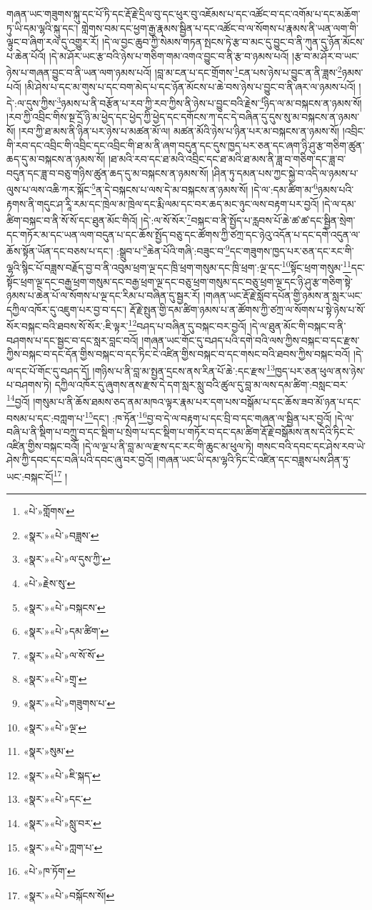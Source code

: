 གཞན་ཡང་གཟུགས་སྐུ་དང་པོ་ཏི་དང་རྡོ་རྗེ་དྲིལ་བུ་དང་ཕུར་བུ་འཇོམས་པ་དང་འཚོང་བ་དང་འགོམ་པ་དང་མཆོག་ཏུ་ཡི་དམ་ལྷའི་སྐུ་དང་། གླེགས་བམ་དང་ཕྱག་རྒྱ་རྣམས་སྦྱིན་པ་དང་འཚོང་བ་ལ་སོགས་པ་རྣམས་ནི་ཡན་ལག་གི་ལྟུང་བ་ཞིག་རལ་དུ་འགྱུར་རོ། །དེ་ལ་བྱང་ཆུབ་ཀྱི་སེམས་གཏན་སྤངས་ཏེ་རྩ་བ་མང་དུ་བྱུང་བ་ནི་ཀུན་དུ་ཉོན་མོངས་པ་ཆེན་པོའོ། །དེ་མ་ཤོར་ཡང་རྩ་བའི་ཉེས་པ་གཅིག་གམ་འགའ་བྱུང་བ་ནི་རྩ་བ་ཉམས་པའོ། །རྩ་བ་མ་ཤོར་བ་ཡང་ཉེས་པ་གཞན་བྱུང་བ་ནི་ཡན་ལག་ཉམས་པའོ། །བླ་མ་ངན་པ་དང་གྲོགས་\footnote{«པེ་»གློགས་}ངན་པས་ཉེས་པ་བྱུང་ན་ནི་ཟླས་\footnote{«སྣར་»«པེ་»བཟླས་}ཉམས་པའོ། །མི་ཤེས་པ་དང་མ་གུས་པ་དང་བག་མེད་པ་དང་ཉོན་མོངས་པ་ཆེ་བས་ཉེས་པ་བྱུང་བ་ནི་ཞར་ལ་ཉམས་པའོ། །དེ་:ལ་དུས་ཀྱིས་\footnote{«སྣར་»«པེ་»ལ་དུས་ཀྱི་}ཉམས་པ་ནི་བརྩོན་པ་རབ་ཀྱི་རབ་ཀྱིས་ནི་ཉེས་པ་བྱུང་བའི་རྗེས་\footnote{«པེ་»རྗེས་སུ་}ཉིད་ལ་མ་བསྐངས་ན་ཉམས་སོ། །རབ་ཀྱི་འབྲིང་གིས་སྔ་དྲོ་ཉི་མ་ཕྱེད་དང་ཕྱེད་ཀྱི་ཕྱེད་དང་དགོངས་ཀ་དང་དེ་བཞིན་དུ་དུས་སུ་མ་བསྐངས་ན་ཉམས་སོ། །རབ་ཀྱི་ཐ་མས་ནི་ཉིན་པར་ཉེས་པ་མཚན་མོ་ལ། མཚན་མོའི་ཉེས་པ་ཉིན་པར་མ་བསྐངས་ན་ཉམས་སོ། །འབྲིང་གི་རབ་དང་འབྲིང་གི་འབྲིང་དང་འབྲིང་གི་ཐ་མ་ནི་ཞག་བདུན་དང་དུས་ཁྱད་པར་ཅན་དང་ཞག་ཉི་ཤུ་རྩ་གཅིག་ཚུན་ཆད་དུ་མ་བསྐངས་ན་ཉམས་སོ། །ཐ་མའི་རབ་དང་ཐ་མའི་འབྲིང་དང་ཐ་མའི་ཐ་མས་ནི་ཟླ་བ་གཅིག་དང་ཟླ་བ་བདུན་དང་ཟླ་བ་བཅུ་གཉིས་ཚུན་ཆད་དུ་མ་བསྐངས་ན་ཉམས་སོ། །ཤིན་ཏུ་དམན་པས་ཀྱང་སྐྱེ་བ་འདི་ལ་ཉམས་པ་ལུས་པ་ལས་འཆི་ཀར་སྐོང་\footnote{«སྣར་»«པེ་»བསྐངས་}ན་དེ་བསྐངས་པ་ལས་དེ་མ་བསྐངས་ན་ཉམས་སོ། །དེ་ལ་:དམ་ཚིག་མ་\footnote{«སྣར་»«པེ་»དམ་ཚིག་}ཉམས་པའི་རྟགས་ནི་གདུང་ཤ་རཱི་རམ་དང་ཁྲེལ་མ་ཁྲེལ་དང་རྨི་ལམ་དང་བར་ཆད་མང་ཉུང་ལས་བརྟག་པར་བྱའོ། །དེ་ལ་དམ་ཚིག་བསྐང་བ་ནི་སོ་སོ་དང་ཐུན་མོང་གིའོ། །དེ་:ལ་སོ་སོར་\footnote{«སྣར་»«པེ་»ལ་སོ་སོ་}བསྐང་བ་ནི་སྤྱོད་པ་རླབས་པོ་ཆེ་ཚ་ཚ་དང་སྦྱིན་སྲེག་དང་གཏོར་མ་དང་ཡན་ལག་བདུན་པ་དང་ཆོས་སྤྱོད་བཅུ་དང་ཚོགས་ཀྱི་ཙཀྲ་དང་ཉེའུ་འདོན་པ་དང་དགེ་འདུན་ལ་ཆོས་སྟོན་ཡོན་དང་བཅས་པ་དང་། :སྒྲུབ་པ་\footnote{«སྣར་»«པེ་»གྲྭ་}ཆེན་པོའི་གཞི་:བཟུང་བ་\footnote{«སྣར་»«པེ་»གཟུགས་པ་}དང་གཟུགས་ཁྱད་པར་ཅན་དང་རང་གི་ལྷའི་སྙིང་པོ་བཟླས་བརྗོད་བྱ་བ་ནི་འབུམ་ཕྲག་ལྔ་དང་ཁྲི་ཕྲག་གསུམ་དང་ཁྲི་ཕྲག་:ལྔ་དང་\footnote{«སྣར་»«པེ་»ལྔ་}སྟོང་ཕྲག་གསུམ་\footnote{«སྣར་»སུམ་}དང་སྟོང་ཕྲག་ལྔ་དང་བརྒྱ་ཕྲག་གསུམ་དང་བརྒྱ་ཕྲག་ལྔ་དང་བཅུ་ཕྲག་གསུམ་དང་བཅུ་ཕྲག་ལྔ་དང་ཉི་ཤུ་རྩ་གཅིག་སྟེ་ཉམས་པ་ཆེན་པོ་ལ་སོགས་པ་ལྔ་དང་རིམ་པ་བཞིན་དུ་སྦྱར་རོ། །གཞན་ཡང་རྡོ་རྗེ་སློབ་དཔོན་གྱི་ཉམས་ན་སླར་ཡང་དཀྱིལ་འཁོར་དུ་འཇུག་པར་བྱ་བ་དང་། རྡོ་རྗེ་སྤུན་གྱི་དམ་ཚིག་ཉམས་པ་ན་ཚོགས་ཀྱི་ཙཀྲ་ལ་སོགས་པ་སྟེ་ཉེས་པ་སོ་སོར་བསྐང་བའི་ཐབས་སོ་སོར་:ཇི་ལྟར་\footnote{«སྣར་»«པེ་»ཇི་སྐད་}བཤད་པ་བཞིན་དུ་བསྐང་བར་བྱའོ། །དེ་ལ་ཐུན་མོང་གི་བསྐང་བ་ནི་བཤགས་པ་དང་སྦྱང་བ་དང་སླར་བླང་བའོ། །གཞན་ཡང་གོང་དུ་བཤད་པའི་དགེ་བའི་ལས་ཀྱིས་བསྐང་བ་དང་རྫས་ཀྱིས་བསྐང་བ་དང་དོན་གྱིས་བསྐང་བ་དང་ཏིང་ངེ་འཛིན་གྱིས་བསྐང་བ་དང་གསང་བའི་ཐབས་ཀྱིས་བསྐང་བའོ། །དེ་ལ་དང་པོ་གོང་དུ་བཤད་དོ། །གཉིས་པ་ནི་བླ་མ་སྤྱན་དྲངས་ནས་རིན་པོ་ཆེ་:དང་རྫས་\footnote{«སྣར་»«པེ་»དང་}ཁྱད་པར་ཅན་ཕུལ་ནས་ཉེས་པ་བཤགས་ཏེ། དཀྱིལ་འཁོར་དུ་ཞུགས་ནས་རྫས་དེ་དག་སླར་སླུ་བའི་ཚུལ་དུ་བླ་མ་ལས་དམ་ཚིག་:བསླང་བར་\footnote{«སྣར་»«པེ་»སླུ་བར་}བྱའོ། །གསུམ་པ་ནི་ཆོས་ཐམས་ཅད་ནམ་མཁའ་ལྟར་རྣམ་པར་དག་པས་བསྒོམ་པ་དང་ཆོས་ཟབ་མོ་ཉན་པ་དང་བསམ་པ་དང་:བཀླག་པ་\footnote{«སྣར་»«པེ་»ཀླག་པ་}དང་། :ཁ་ཏོན་\footnote{«པེ་»ཁ་ཏོག་}བྱ་བ་དེ་ལ་བརྟག་པ་དང་བྲི་བ་དང་གཞན་ལ་སྦྱིན་པར་བྱའོ། །དེ་ལ་བཞི་པ་ནི་སྡིག་པ་བཀྲུ་བ་དང་སྡིག་པ་སྲེག་པ་དང་སྡིག་པ་གཏོར་བ་དང་དམ་ཚིག་རྡོ་རྗེ་བསྒོམས་ནས་དེའི་ཏིང་ངེ་འཛིན་གྱིས་བསྐང་བའོ། །དེ་ལ་ལྔ་པ་ནི་བླ་མ་ལ་རྫས་དང་རང་གི་ཆུང་མ་ཕུལ་ཏེ། གསང་བའི་དབང་དང་ཤེས་རབ་ཡེ་ཤེས་ཀྱི་དབང་དང་བཞི་པའི་དབང་ཞུ་བར་བྱའོ། །གཞན་ཡང་ཡི་དམ་ལྷའི་ཏིང་ངེ་འཛིན་དང་བཟླས་པས་ཤིན་ཏུ་ཡང་:བསྐང་ངོ།\footnote{«སྣར་»«པེ་»བསྐོངས་སོ།} །

